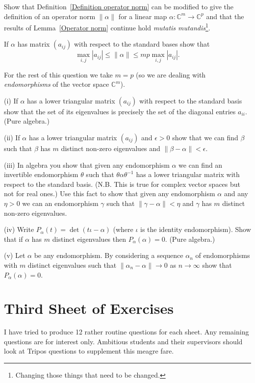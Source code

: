 \begin{question}
Show that Definition~\ref{Definition operator norm}
can be modified to give the definition of an operator
norm $\|\alpha\|$ for a linear map 
$\alpha:{\mathbb C}^{m}\rightarrow{\mathbb C}^{p}$
and that the results of Lemma~\ref{Operator norm}
continue
hold \emph{mutatis mutandis}\footnote{Changing those
things that need to be changed.}.

If $\alpha$ has matrix $(a_{ij})$ with respect to
the standard bases show that
\[\max_{i,j}|a_{ij}|\leq \|\alpha\|\leq mp\max_{i,j}|a_{ij}|.\]

For the rest of this question we take $m=p$ (so we
are dealing with \emph{endomorphisms} of the
vector space ${\mathbb C}^{m}$).

(i) If $\alpha$ has a lower triangular matrix $(a_{ij})$
with respect to the standard basis show that the
set of its eigenvalues is precisely the set
of the diagonal entries $a_{ii}$. (Pure algebra.)

(ii) If $\alpha$ has a lower triangular matrix $(a_{ij})$
and $\epsilon>0$ show that we can find $\beta$ such that
$\beta$ has $m$ distinct non-zero eigenvalues and
$\|\beta-\alpha\|<\epsilon$.

(iii) In algebra you show that given any endomorphism
$\alpha$ we can find an invertible endomorphism
$\theta$ such that $\theta\alpha\theta^{-1}$
has a lower triangular matrix
with respect to the standard basis.
(N.B. This is true for complex vector spaces but not
for real ones.) Use this fact to show that
given any endomorphism
$\alpha$ and any $\eta>0$ we can an endomorphism $\gamma$
such that $\|\gamma-\alpha\|<\eta$ and 
$\gamma$ has $m$ distinct non-zero eigenvalues.

(iv) Write $P_{\alpha}(t)=\det(t\iota-\alpha)$
(where $\iota$ is the identity endomorphism). 
Show that if $\alpha$ has $m$ distinct eigenvalues
then $P_{\alpha}(\alpha)=0$. (Pure algebra.)

(v) Let $\alpha$ be any endomorphism. By considering
a sequence $\alpha_{n}$ of endomorphisms with
$m$ distinct eigenvalues such that 
$\|\alpha_{n}-\alpha\|\rightarrow 0$ as $n\rightarrow \infty$
show that $P_{\alpha}(\alpha)=0$.

\end{question}    


\section{Third Sheet of Exercises}
I have tried to
produce 12 rather routine questions for each sheet.
Any remaining questions are for interest
only. Ambitious
students and their supervisors should look at Tripos
questions to supplement this meagre fare.

